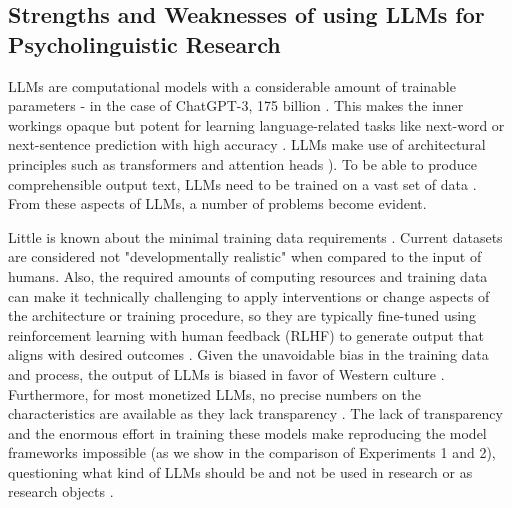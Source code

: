 \documentclass[doc, a4paper]{apa7}
\begin{document}
\subsection*{Strengths and Weaknesses of using LLMs for Psycholinguistic Research}

LLMs are computational models with a considerable amount of trainable parameters - in the case of ChatGPT-3, 175 billion \citep{brown_language_2020}. This makes the inner workings opaque but potent for learning language-related tasks like next-word or next-sentence prediction with high accuracy \citep[e.g.,][]{devlin2019bertpretrainingdeepbidirectional}. LLMs make use of architectural principles such as transformers and attention heads \cite[\cite{vaswani_attention_2017}; See also][for an introduction]{hussain_tutorial_2024}). To be able to produce comprehensible output text, LLMs need to be trained on a vast set of data \citep{bender_dangers_2021}. From these aspects of LLMs, a number of problems become evident. 

Little is known about the minimal training data requirements \citep{hosseini_artificial_2022}. Current datasets are considered not "developmentally realistic" when compared to the input of humans. Also, the required amounts of computing resources and training data can make it technically challenging to apply interventions or change aspects of the architecture or training procedure, so they are typically fine-tuned using reinforcement learning with human feedback (RLHF) to generate output that aligns with desired outcomes \citep[see][for how to remove troubling model outputs]{ouyang_training_2022}. Given the unavoidable bias in the training data and process, the output of LLMs is biased in favor of Western culture \citep{atari_which_2023}. Furthermore, for most monetized LLMs, no precise numbers on the characteristics are available as they lack transparency \citep{liesenfeld_opening_2023, frank_openly_2023}. The lack of transparency and the enormous effort in training these models make reproducing the model frameworks impossible (as we show in the comparison of Experiments 1 and 2), questioning what kind of LLMs should be and not be used in research or as research objects \citep{bender_dangers_2021, liesenfeld_opening_2023}. 
\end{document}
